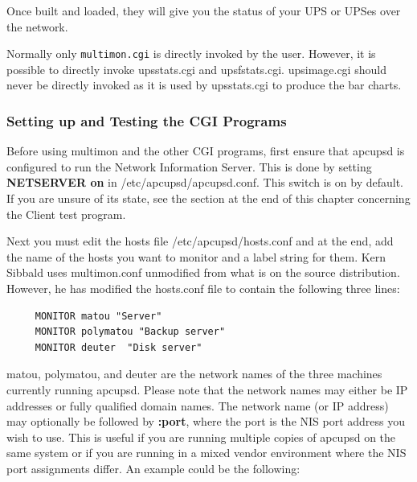 {{{{{{Once built and loaded, they will give you the status of your UPS or UPSes over
the network.

Normally only {\tt multimon.cgi} is directly invoked by the
user. However, it is possible to directly invoke upsstats.cgi and
upsfstats.cgi. upsimage.cgi should never be directly invoked as it is used by
upsstats.cgi to produce the bar charts. 

\label{Setting-up-and-Testing-the-CGI-Programs}

\subsubsection*{Setting up and Testing the CGI Programs}

\label{index-Setup-CGI-programs-122}
\label{index-Testing-CGI-programs-123}

Before using multimon and the other CGI programs, first ensure that apcupsd is
configured to run the Network Information Server. This is done by setting {\bf
NETSERVER on} in /etc/apcupsd/apcupsd.conf.  This switch is on by default.  If
you are unsure of its state, see the section at the end of this chapter
concerning the Client test program.  

Next you must edit the hosts file /etc/apcupsd/hosts.conf and at the end, add
the name of the hosts you want to monitor and a label string for them. Kern
Sibbald uses multimon.conf unmodified from what is on the source distribution.
However, he has modified the hosts.conf file to contain the following three
lines: 

\footnotesize
\begin{verbatim}
     MONITOR matou "Server"
     MONITOR polymatou "Backup server"
     MONITOR deuter  "Disk server"
\end{verbatim}
\normalsize

matou, polymatou, and deuter are the network names of the three machines
currently running apcupsd. Please note that the network names may either be IP
addresses or fully qualified domain names.  The network name (or IP address)
may optionally be followed by {\bf :\lt{}port\gt{}}, where the port is the NIS
port address you wish to use. This is useful if you are running multiple
copies of apcupsd on the same system or if you are running in a mixed vendor
environment where the NIS port assignments differ. An example could be the
following: 

}}}}}}
